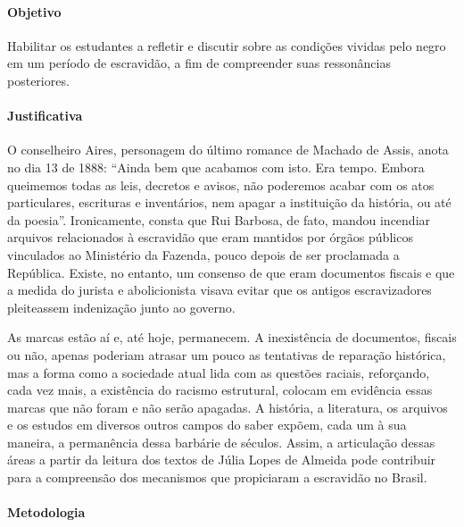 \documentclass[12pt]{extarticle}
\begin{document}

\paragraph{Objetivo} Habilitar os estudantes a refletir e discutir sobre
as condições vividas pelo negro em um período de escravidão, a fim de
compreender suas ressonâncias posteriores.

\paragraph{Justificativa} O conselheiro Aires, personagem do último
romance de Machado de Assis, anota no dia 13 de 1888: ``Ainda bem que
acabamos com isto. Era tempo. Embora queimemos todas as leis, decretos e
avisos, não poderemos acabar com os atos particulares, escrituras e
inventários, nem apagar a instituição da história, ou até da poesia''.
Ironicamente, consta que Rui Barbosa, de fato, mandou incendiar arquivos
relacionados à escravidão que eram mantidos por órgãos públicos
vinculados ao Ministério da Fazenda, pouco depois de ser proclamada a
República. Existe, no entanto, um consenso de que eram documentos
fiscais e que a medida do jurista e abolicionista visava evitar que os
antigos escravizadores pleiteassem indenização junto ao governo.

As marcas estão aí e, até hoje, permanecem. A inexistência de documentos,
fiscais ou não, apenas poderiam atrasar um pouco as tentativas de
reparação histórica, mas a forma como a sociedade atual lida com as
questões raciais, reforçando, cada vez mais, a existência do racismo
estrutural, colocam em evidência essas marcas que não foram e não serão
apagadas. A história, a literatura, os arquivos e os estudos em diversos
outros campos do saber expõem, cada um à sua maneira, a permanência
dessa barbárie de séculos. Assim, a articulação dessas áreas a partir da
leitura dos textos de Júlia Lopes de Almeida pode contribuir para a
compreensão dos mecanismos que propiciaram a escravidão no Brasil.

\paragraph{Metodologia}
\end{document}
